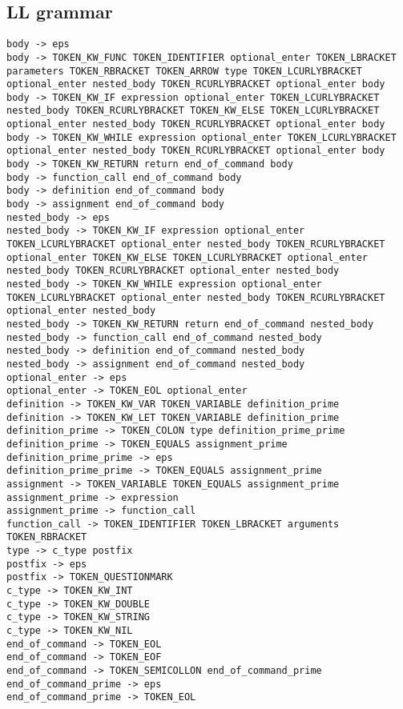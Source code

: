 \documentclass[11pt]{article}
\begin{document}
\subsection{LL grammar}

\begin{lstlisting}[style=PseudoStyle, caption=LL (1) grammar example]
body -> eps
body -> TOKEN_KW_FUNC TOKEN_IDENTIFIER optional_enter TOKEN_LBRACKET parameters TOKEN_RBRACKET TOKEN_ARROW type TOKEN_LCURLYBRACKET optional_enter nested_body TOKEN_RCURLYBRACKET optional_enter body
body -> TOKEN_KW_IF expression optional_enter TOKEN_LCURLYBRACKET nested_body TOKEN_RCURLYBRACKET TOKEN_KW_ELSE TOKEN_LCURLYBRACKET optional_enter nested_body TOKEN_RCURLYBRACKET optional_enter body
body -> TOKEN_KW_WHILE expression optional_enter TOKEN_LCURLYBRACKET optional_enter nested_body TOKEN_RCURLYBRACKET optional_enter body
body -> TOKEN_KW_RETURN return end_of_command body
body -> function_call end_of_command body
body -> definition end_of_command body
body -> assignment end_of_command body
nested_body -> eps
nested_body -> TOKEN_KW_IF expression optional_enter TOKEN_LCURLYBRACKET optional_enter nested_body TOKEN_RCURLYBRACKET optional_enter TOKEN_KW_ELSE TOKEN_LCURLYBRACKET optional_enter nested_body TOKEN_RCURLYBRACKET optional_enter nested_body
nested_body -> TOKEN_KW_WHILE expression optional_enter TOKEN_LCURLYBRACKET optional_enter nested_body TOKEN_RCURLYBRACKET optional_enter nested_body
nested_body -> TOKEN_KW_RETURN return end_of_command nested_body
nested_body -> function_call end_of_command nested_body
nested_body -> definition end_of_command nested_body
nested_body -> assignment end_of_command nested_body
optional_enter -> eps
optional_enter -> TOKEN_EOL optional_enter
definition -> TOKEN_KW_VAR TOKEN_VARIABLE definition_prime
definition -> TOKEN_KW_LET TOKEN_VARIABLE definition_prime
definition_prime -> TOKEN_COLON type definition_prime_prime
definition_prime -> TOKEN_EQUALS assignment_prime
definition_prime_prime -> eps
definition_prime_prime -> TOKEN_EQUALS assignment_prime
assignment -> TOKEN_VARIABLE TOKEN_EQUALS assignment_prime
assignment_prime -> expression
assignment_prime -> function_call
function_call -> TOKEN_IDENTIFIER TOKEN_LBRACKET arguments TOKEN_RBRACKET
type -> c_type postfix
postfix -> eps
postfix -> TOKEN_QUESTIONMARK
c_type -> TOKEN_KW_INT
c_type -> TOKEN_KW_DOUBLE
c_type -> TOKEN_KW_STRING
c_type -> TOKEN_KW_NIL
end_of_command -> TOKEN_EOL
end_of_command -> TOKEN_EOF
end_of_command -> TOKEN_SEMICOLLON end_of_command_prime
end_of_command_prime -> eps
end_of_command_prime -> TOKEN_EOL

\end{lstlisting}
\end{document}
